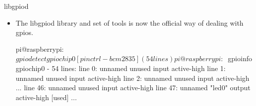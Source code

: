 \begin{frame}
   {libgpiod}
   \begin{itemize}
      \item The libgpiod library and set of tools is now the official way
	      of dealing with gpios.
      \begin{raw}
pi@raspberrypi:~$ gpiodetect 
gpiochip0 [pinctrl-bcm2835] (54 lines)
pi@raspberrypi:~$ gpioinfo 
gpiochip0 - 54 lines:
        line   0:      unnamed       unused   input  active-high
        line   1:      unnamed       unused   input  active-high
        line   2:      unnamed       unused   input  active-high
...
        line  46:      unnamed       unused   input  active-high
        line  47:      unnamed       "led0"  output  active-high [used]
...
      \end{raw}
   \end{itemize}
\end{frame}

\cprotect\note{


}

